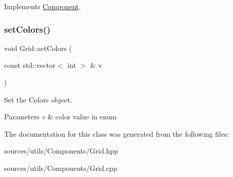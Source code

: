 Implements \hyperlink{classComponent_aede74a18a443413465216f383a046028}{Component}.

\mbox{\label{classGrid_a7a93d93a3acaac29bc8fa81ecf30f877}} 
\subsubsection{\texorpdfstring{set\+Colors()}{setColors()}}
{\footnotesize\ttfamily void Grid\+::set\+Colors (\begin{DoxyParamCaption}\item[{const std\+::vector$<$ int $>$ \&}]{v }\end{DoxyParamCaption})}



Set the Colors object. 


\begin{DoxyParams}{Parameters}
{\em v} & color value in enum \\
\hline
\end{DoxyParams}


The documentation for this class was generated from the following files\+:\begin{DoxyCompactItemize}
\item 
sources/utils/\+Components/Grid.\+hpp\item 
sources/utils/\+Components/Grid.\+cpp\end{DoxyCompactItemize}
